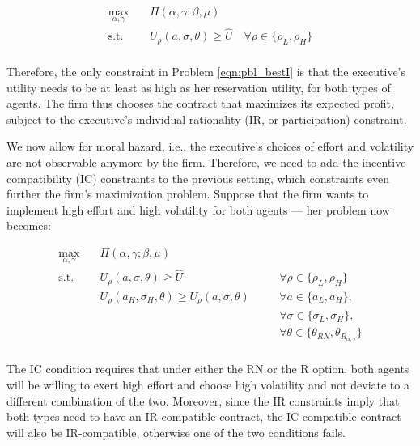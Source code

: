 \begin{equation}
    \label{eqn:pbl_bestI}
    \begin{aligned}
    \max_{\alpha, \gamma} \quad & \Pi (\alpha, \gamma; \beta, \mu) \\
    \textrm{s.t.}       \quad & U_\rho(a, \sigma, \theta) \ge \hat{U} \quad \forall \rho \in \{ \rho_L, \rho_H \}  \\
    \end{aligned}
\end{equation}

Therefore, the only constraint in Problem \ref*{eqn:pbl_bestI} is that the executive's utility needs to be at least as high as her reservation utility, for both types of agents. The firm thus chooses the contract that maximizes its expected profit, subject to the executive's individual rationality (IR, or participation) constraint.

We now allow for moral hazard, i.e., the executive's choices of effort and volatility are not observable anymore by the firm. Therefore, we need to add the incentive compatibility (IC) constraints to the previous setting, which constraints even further the firm's maximization problem. Suppose that the firm wants to implement high effort and high volatility for both agents --- her problem now becomes:

\begin{equation}
    \label{eqn:pbl_bestII}
    \begin{alignedat}{2}
        \max_{\alpha, \gamma} \quad & \Pi (\alpha, \gamma; \beta, \mu) \\
        \textrm{s.t.}       \quad & U_\rho(a, \sigma, \theta) \ge \hat{U} & \quad & \forall \rho \in \{ \rho_L, \rho_H \} \\
                            \quad & U_\rho(a_H, \sigma_H, \theta) \ge U_\rho(a, \sigma, \theta) & & \forall a \in \{ a_L, a_H \}, \\
                            \quad & & & \forall \sigma \in \{ \sigma_L, \sigma_H \}, \\
                            \quad & & & \forall \theta \in \{ \theta_{RN}, \theta_{R_{\alpha, \gamma}} \} \\ 
    \end{alignedat}
\end{equation}

The IC condition requires that under either the RN or the R option, both agents will be willing to exert high effort and choose high volatility and not deviate to a different combination of the two. Moreover, since the IR constraints imply that both types need to have an IR-compatible contract, the IC-compatible contract will also be IR-compatible, otherwise one of the two conditions fails.


